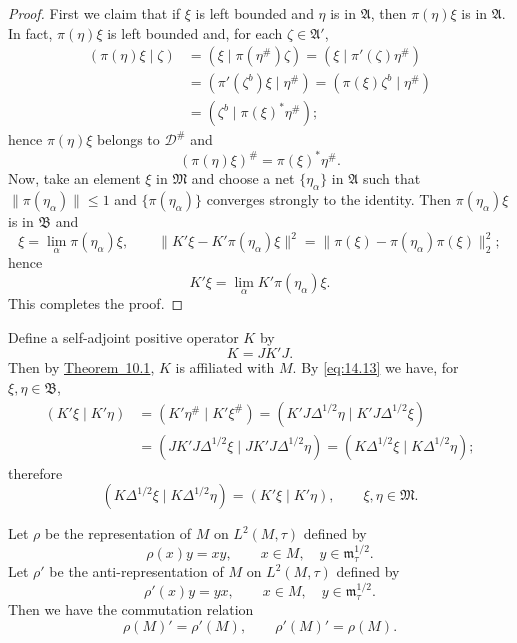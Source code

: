 \documentclass[12pt,b5paper,twoside]{article}
\theoremstyle{takesaki}
\numberwithin{equation}{section}
\begin{document}
\begin{proof}
First we claim that if $\xi$ is left bounded and $\eta$ is in
$\mathfrak A$, then $\pi(\eta)\xi$ is in $\mathfrak A$.  In fact,
$\pi(\eta)\xi$ is left bounded and, for each $\zeta\in\mathfrak A'$,
\begin{align*}
 (\pi(\eta)\xi\mid\zeta)
 &=(\xi\mid\pi(\eta^{\#})\zeta)
  =(\xi\mid\pi'(\zeta)\eta^{\#})\\
 &=(\pi'(\zeta^b)\xi\mid\eta^{\#})
  =(\pi(\xi)\zeta^b\mid\eta^{\#})\\
 &=(\zeta^b\mid\pi(\xi)^*\eta^{\#});
\end{align*}
hence $\pi(\eta)\xi$ belongs to $\mathcal D^{\#}$ and
\[
 (\pi(\eta)\xi)^{\#}=\pi(\xi)^*\eta^{\#}.
\]
Now, take an element $\xi$ in $\mathfrak M$ and choose a net
$\{\eta_\alpha\}$ in $\mathfrak A$ such that
$\|\pi(\eta_\alpha)\|\leq1$ and $\{\pi(\eta_\alpha)\}$ converges
strongly to the identity.  Then $\pi(\eta_\alpha)\xi$ is in
$\mathfrak B$ and
\[
 \xi=\lim_\alpha\pi(\eta_\alpha)\xi,
 \qquad
 \|K'\xi-K'\pi(\eta_\alpha)\xi\|^2
 =\|\pi(\xi)-\pi(\eta_\alpha)\pi(\xi)\|_2^2;
\]
hence
\[
 K'\xi=\lim_\alpha K'\pi(\eta_\alpha)\xi.
\]
This completes the proof.
\end{proof}

Define a self-adjoint positive operator $K$ by
\[
 K=JK'J.
\]
Then by \hyperref[thm:10.1]{Theorem~10.1}, $K$ is affiliated with $M$.
By \eqref{eq:14.13} we have, for $\xi,\eta\in\mathfrak B$,
\begin{align*}
 (K'\xi\mid K'\eta)
 &=(K'\eta^{\#}\mid K'\xi^{\#})
  =(K'J\Delta^{1/2}\eta\mid K'J\Delta^{1/2}\xi)\\
 &=(JK'J\Delta^{1/2}\xi\mid JK'J\Delta^{1/2}\eta)
  =(K\Delta^{1/2}\xi\mid K\Delta^{1/2}\eta);
\end{align*}
therefore
\begin{equation}
 (K\Delta^{1/2}\xi\mid K\Delta^{1/2}\eta)
  =(K'\xi\mid K'\eta),
 \qquad \xi,\eta\in\mathfrak M.
 \tag{14.14}\label{eq:14.14}
\end{equation}

Let $\rho$ be the representation of $M$ on $L^2(M,\tau)$ defined by
\[
 \rho(x)y=xy,
 \qquad x\in M,\quad y\in\mathfrak m_\tau^{1/2}.
\]
Let $\rho'$ be the anti-representation of $M$ on $L^2(M,\tau)$
defined by
\[
 \rho'(x)y=yx,
 \qquad x\in M,\quad y\in\mathfrak m_\tau^{1/2}.
\]
Then we have the commutation relation
\[
 \rho(M)'=\rho'(M),
 \qquad \rho'(M)'=\rho(M).
\]
\end{document}
